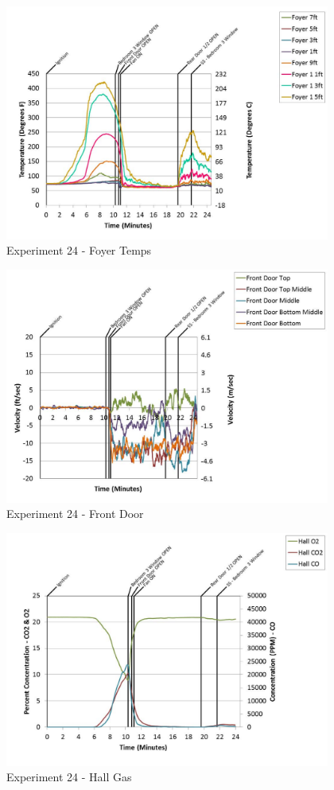 \documentclass{article}
\begin{document}
\begin{appendices}
	\clearpage

	\begin{figure}[h!]
		\centering
		\includegraphics[height=3.05in]{0_Images/Results_Charts/Exp_24_Charts/FoyerTemps.pdf}
		\caption{Experiment 24 - Foyer Temps}
	\end{figure}
 

	\begin{figure}[h!]
		\centering
		\includegraphics[height=3.05in]{0_Images/Results_Charts/Exp_24_Charts/FrontDoor.pdf}
		\caption{Experiment 24 - Front Door}
	\end{figure}
 
	\clearpage

	\begin{figure}[h!]
		\centering
		\includegraphics[height=3.05in]{0_Images/Results_Charts/Exp_24_Charts/HallGas.pdf}
		\caption{Experiment 24 - Hall Gas}
	\end{figure}
 


\end{appendices}
\end{document}
